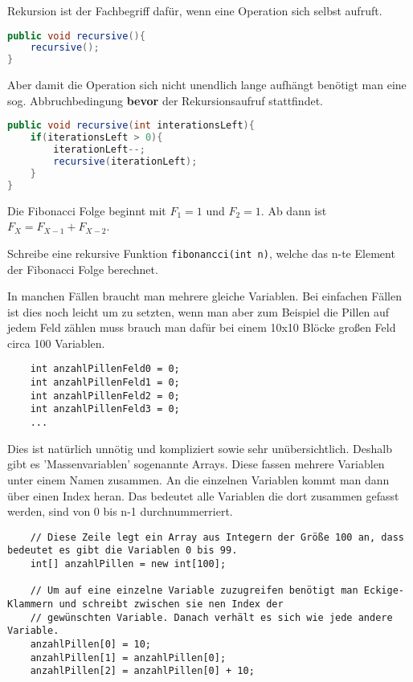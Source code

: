 \begin{questions}

    Rekursion ist der Fachbegriff dafür, wenn eine Operation sich selbst aufruft.
    \begin{lstlisting}[language=Java]
public void recursive(){
    recursive();
}
    \end{lstlisting}

    Aber damit die Operation sich nicht unendlich lange aufhängt benötigt man eine sog. Abbruchbedingung \textbf{bevor} der Rekursionsaufruf stattfindet.

    \begin{lstlisting}[language=Java]
public void recursive(int interationsLeft){
    if(iterationsLeft > 0){
        iterationLeft--;
        recursive(iterationLeft);
    }
}
    \end{lstlisting}

    Die Fibonacci Folge beginnt mit $F_1 = 1$ und $F_2 = 1$. Ab dann ist $F_X = F_{X-1} + F_{X-2}$.

    Schreibe eine rekursive Funktion \texttt{fibonancci(int n)}, welche das n-te Element der Fibonacci Folge berechnet.

    In manchen Fällen braucht man mehrere gleiche Variablen. Bei einfachen Fällen ist dies noch leicht um zu setzten, wenn man aber zum Beispiel die Pillen auf jedem Feld zählen muss brauch man dafür bei einem 10x10 Blöcke großen Feld circa 100 Variablen.

    \begin{lstlisting}
    int anzahlPillenFeld0 = 0;
    int anzahlPillenFeld1 = 0;
    int anzahlPillenFeld2 = 0;
    int anzahlPillenFeld3 = 0;
    ...
    \end{lstlisting}

    Dies ist natürlich unnötig und kompliziert sowie sehr unübersichtlich. Deshalb gibt es 'Massenvariablen' sogenannte Arrays. Diese fassen mehrere Variablen unter einem Namen zusammen. An die einzelnen Variablen kommt man dann über einen Index heran. Das bedeutet alle Variablen die dort zusammen gefasst werden, sind von 0 bis n-1 durchnummerriert.

    \begin{lstlisting}
    // Diese Zeile legt ein Array aus Integern der Größe 100 an, dass bedeutet es gibt die Variablen 0 bis 99.
    int[] anzahlPillen = new int[100];

    // Um auf eine einzelne Variable zuzugreifen benötigt man Eckige-Klammern und schreibt zwischen sie nen Index der
    // gewünschten Variable. Danach verhält es sich wie jede andere Variable.
    anzahlPillen[0] = 10;
    anzahlPillen[1] = anzahlPillen[0];
    anzahlPillen[2] = anzahlPillen[0] + 10;
    \end{lstlisting}


\end{questions}
